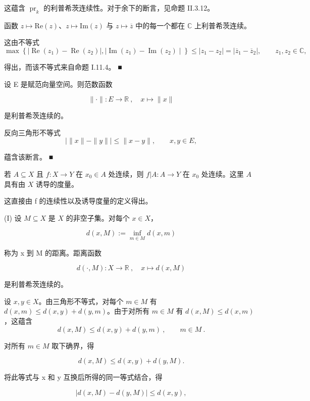 \begin{example}
\begin{items}
这蕴含 $ \operatorname{pr}_{k} $ 的利普希茨连续性。对于余下的断言，见命题 II.3.12。

\item

函数 $ z \mapsto \mathrm{Re}(z) $、$ z \mapsto \mathrm{Im}(z) $ 与 $ z \mapsto \overline{z} $ 中的每一个都在 $ \mathbb{C} $ 上利普希茨连续。

\proofhead
这由不等式
\[
\max\left\{\mid\operatorname{Re}(z_{1})-\operatorname{Re}(z_{2})\mid,\mid\operatorname{Im}(z_{1})-\operatorname{Im}(z_{2})\mid\right\}\leq\left|z_{1}-z_{2}\right|=\left|\overline{z}_{1}-\overline{z}_{2}\right|,\qquad z_{1},z_{2}\in\mathbb{C},
\]

得出，而该不等式来自命题 I.11.4。 ■

\item

设 E 是赋范向量空间。则范数函数

\[
\|\cdot\|\colon E\to\mathbb{R}~,\quad x\mapsto\|x\|
\]

是利普希茨连续的。

\proofhead
反向三角形不等式
\[
\mid\|x\|-\|y\|\mid\leq\|x-y\|,\qquad x,y\in E,
\]

蕴含该断言。 ■

\item

若 $ A \subseteq X $ 且 $ f: X \to Y $ 在 $ x_0 \in A $ 处连续，则 $ f|A: A \to Y $ 在 $ x_0 $ 处连续。这里 $ A $ 具有由 $ X $ 诱导的度量。

\proofhead
这直接由 f 的连续性以及诱导度量的定义得出。
\end{items}

(I) 设 $ M \subseteq X $ 是 $ X $ 的非空子集。对每个 $ x \in X $，

\[
d(x,M):=\inf_{m\in M}d(x,m)
\]

称为 x 到 M 的距离。距离函数

\[
d(\cdot,M):X\to\mathbb{R}~,\quad x\mapsto d(x,M)
\]

是利普希茨连续的。

\proofhead
设 $ x, y \in X $。由三角形不等式，对每个 $ m \in M $ 有 $ d(x, m) \leq d(x, y) + d(y, m) $。由于对所有 $ m \in M $ 有 $ d(x, M) \leq d(x, m) $，这蕴含
\[
d(x,M)\leq d(x,y)+d(y,m)~,\qquad m\in M~.
\]

对所有 $ m \in M $ 取下确界，得

\[
d(x,M)\leq d(x,y)+d(y,M).
\]

将此等式与 x 和 y 互换后所得的同一等式结合，得

\[
|d(x,M)-d(y,M)|\leq d(x,y),
\]


\end{example}
